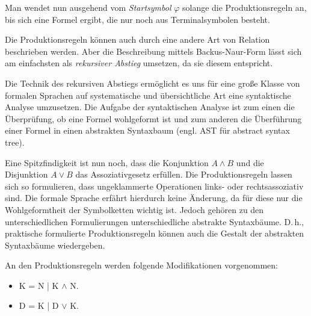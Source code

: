 \documentclass[a4paper,11pt,fleqn,twoside]{scrartcl}
\numberwithin{equation}{section}
\newcommand{\emdef}[1]{\emph{#1}}
\newcommand{\bitem}{\item[\scriptsize\color{gray1}$\blacksquare$]}
\begin{document}
Man wendet nun ausgehend vom \emdef{Startsymbol} $\varphi$
solange die Produktionsregeln an, bis sich eine Formel ergibt,
die nur noch aus Terminalsymbolen besteht.

Die Produktionsregeln können auch durch eine andere Art von
Relation beschrieben werden. Aber die Beschreibung mittels
Backus-Naur-Form lässt sich am einfachsten als
\emdef{rekursiver Abstieg} umsetzen, da sie diesem entspricht.

Die Technik des rekursiven Abstiegs ermöglicht es uns für
eine große Klasse von formalen Sprachen auf systematische
und übersichtliche Art eine syntaktische Analyse umzusetzen.
Die Aufgabe der syntaktischen Analyse ist zum einen die Überprüfung,
ob eine Formel wohlgeformt ist und zum anderen die Überführung
einer Formel in einen abstrakten Syntaxbaum (engl. AST für
abstract syntax tree).

Eine Spitzfindigkeit ist nun noch, dass die Konjunktion $A\land B$
und die Disjunktion $A\lor B$ das Assoziativgesetz erfüllen.
Die Produktionsregeln lassen sich so formulieren, dass ungeklammerte
Operationen links- oder rechtsassoziativ sind. Die formale Sprache
erfährt hierdurch keine Änderung, da für diese nur die
Wohlgeformtheit der Symbolketten wichtig ist. Jedoch gehören zu
den unterschiedlichen Formulierungen unterschiedliche abstrakte
Syntaxbäume. D.\,h., praktische formulierte Produktionsregeln können
auch die Gestalt der abstrakten Syntaxbäume wiedergeben.

An den Produktionsregeln werden folgende Modifikationen vorgenommen:
\begin{itemize}[noitemsep,topsep=4pt]
\setlength\itemsep{4pt}
\bitem K = N | K $\land$ N.
\bitem D = K | D $\lor$ K.
\end{itemize}
\end{document}
